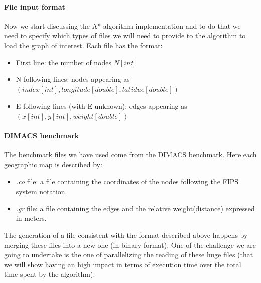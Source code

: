 \documentclass[twocolumn, switch]{article} %
\begin{document}
\paragraph{File input format} 
Now we start discussing the A* algorithm implementation and to do that we need to specify which 
types of files we will need to provide to the algorithm to load the graph of interest. Each file has 
the format:
\begin{itemize}
    \item First line: the number of nodes $N[int]$
    \item N following lines: nodes appearing as $(index[int], longitude[double], latidue[double])$
    \item E following lines (with E unknown): edges appearing as $(x[int], y[int], weight[double])$
\end{itemize}
\paragraph{DIMACS benchmark} 
The benchmark files we have used come from the DIMACS benchmark. Here each geographic map is described by:
\begin{itemize}
  \item \textit{.co} file: a file containing the coordinates of the nodes following the FIPS system notation.
  \item \textit{.gr} file: a file containing the edges and the relative weight(distance) expressed in meters.
\end{itemize}
The generation of a file consistent with the format described above happens by merging these files 
into a new one (in binary format). One of the challenge we are going to undertake is the one of
parallelizing the reading of these huge files (that we will show having an high impact in terms of
execution time over the total time spent by the algorithm).
\end{document}
